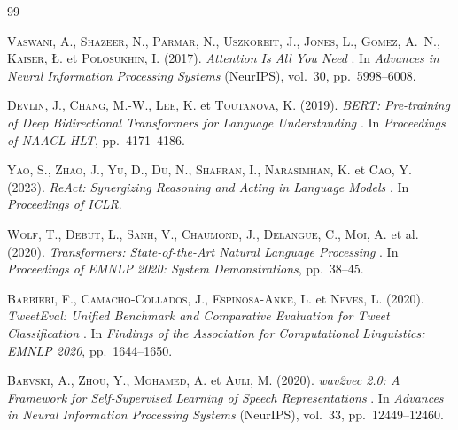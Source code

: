 ﻿
\adjustmtc%
\renewcommand\bibname{BIBLIOGRAPHIE ET WEBOGRAPHIE}

\begin{thebibliography}{99}


\textsc{Vaswani}, A., \textsc{Shazeer}, N., \textsc{Parmar}, N., \textsc{Uszkoreit}, J.,
\textsc{Jones}, L., \textsc{Gomez}, A.~N., \textsc{Kaiser}, \L. et \textsc{Polosukhin}, I.
(2017).
\og \textit{Attention Is All You Need} \fg{}.
In \textit{Advances in Neural Information Processing Systems} (NeurIPS), vol.~30, pp.~5998--6008.

\textsc{Devlin}, J., \textsc{Chang}, M.-W., \textsc{Lee}, K. et \textsc{Toutanova}, K.
(2019).
\og \textit{BERT: Pre-training of Deep Bidirectional Transformers for Language Understanding} \fg{}.
In \textit{Proceedings of NAACL-HLT}, pp.~4171--4186.

\textsc{Yao}, S., \textsc{Zhao}, J., \textsc{Yu}, D., \textsc{Du}, N., \textsc{Shafran}, I.,
\textsc{Narasimhan}, K. et \textsc{Cao}, Y.
(2023).
\og \textit{ReAct: Synergizing Reasoning and Acting in Language Models} \fg{}.
In \textit{Proceedings of ICLR}.

\textsc{Wolf}, T., \textsc{Debut}, L., \textsc{Sanh}, V., \textsc{Chaumond}, J.,
\textsc{Delangue}, C., \textsc{Moi}, A. et al.
(2020).
\og \textit{Transformers: State-of-the-Art Natural Language Processing} \fg{}.
In \textit{Proceedings of EMNLP 2020: System Demonstrations}, pp.~38--45.

\textsc{Barbieri}, F., \textsc{Camacho-Collados}, J., \textsc{Espinosa-Anke}, L. et \textsc{Neves}, L.
(2020).
\og \textit{TweetEval: Unified Benchmark and Comparative Evaluation for Tweet Classification} \fg{}.
In \textit{Findings of the Association for Computational Linguistics: EMNLP 2020}, pp.~1644--1650.

\textsc{Baevski}, A., \textsc{Zhou}, Y., \textsc{Mohamed}, A. et \textsc{Auli}, M.
(2020).
\og \textit{wav2vec 2.0: A Framework for Self-Supervised Learning of Speech Representations} \fg{}.
In \textit{Advances in Neural Information Processing Systems} (NeurIPS), vol.~33, pp.~12449--12460.


\end{thebibliography}
